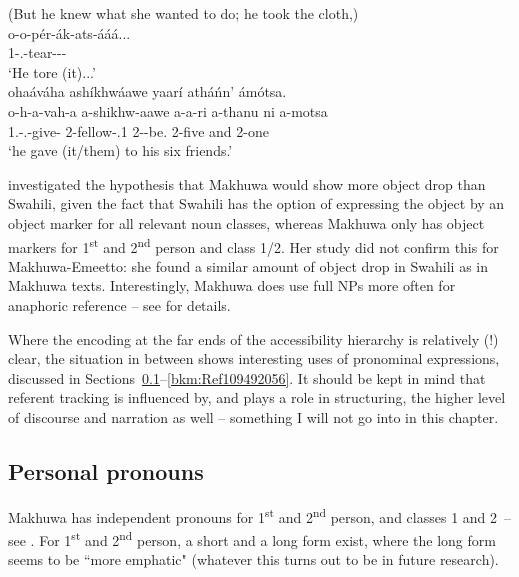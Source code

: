 \documentclass[output=paper]{langscibook}
\begin{document}
\z

\ea
\label{bkm:Ref110500118}
(But he knew what she wanted to do; he took the cloth,)\\
\gll
o{}-o{}-pér{}-ák{}-ats{}-ááá... \\
1\SM{}-\PFV{}.\DJ{}-tear-\DUR{}-\PLUR{}-\FV{}\\
\glt
‘He tore (it)...’\\

\sn
ohaáváha ashíkhwáawe yaarí athá\'{n}n’ ámótsa.\\
\gll
o-h-a-vah-a  a-shikhw-aawe  a-a-ri  a-thanu  ni  a-motsa\\
1\SG.\SM-\PFV.\OM{}-give-\FV{}  2-fellow-\POSS{}.1  2-\PST{}-be.\REL{}  2-five  and  2-one\\
\glt
‘he gave (it/them) to his six friends.’
\z


\citet{Poeta2016} investigated the hypothesis that Makhuwa would show more object drop than Swahili, given the fact that Swahili has the option of expressing the object by an object marker for all relevant noun classes, whereas Makhuwa only has object markers for 1\textsuperscript{st} and 2\textsuperscript{nd} person and class 1/2. Her study did not confirm this for Makhuwa-Emeetto: she found a similar amount of object drop in Swahili as in Makhuwa texts. Interestingly, Makhuwa does use full NPs more often for anaphoric reference – see \citet{Poeta2016} for details.

Where the encoding at the far ends of the accessibility hierarchy is relatively (!) clear, the situation in between shows interesting uses of pronominal expressions, discussed in Sections~\ref{bkm:Ref110501311}--\ref{bkm:Ref109492056}. It should be kept in mind that referent tracking is influenced by, and plays a role in structuring, the higher level of discourse and narration as well – something I will not go into in this chapter.

\subsection{Personal pronouns}
\label{bkm:Ref110501311}
Makhuwa has independent pronouns for 1\textsuperscript{st} and 2\textsuperscript{nd} person, and classes 1 and 2~-- see . For 1\textsuperscript{st} and 2\textsuperscript{nd} person, a short and a long form exist, where the long form seems to be ``more emphatic" (whatever this turns out to be in future research).
\end{document}
